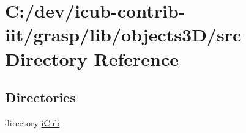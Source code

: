 \section{C\+:/dev/icub-\/contrib-\/iit/grasp/lib/objects3\+D/src Directory Reference}
\label{dir_acc040bef4f47b30e250fa358a960c49}
\subsection*{Directories}
\begin{DoxyCompactItemize}
\item 
directory \hyperlink{dir_b70178e7b6945b6936fc27f331a21ed1}{i\+Cub}
\end{DoxyCompactItemize}
